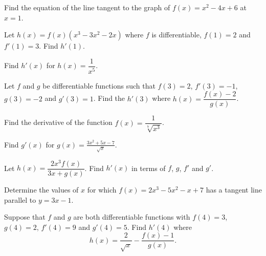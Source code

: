 \begin{exercise}
Find the equation of the line tangent to the graph of \(f(x)=x^2-4x+6\)
at \(x=1\).
\end{exercise}
\vspace*{6\baselineskip}

\begin{exercise}
Let \(h(x)=f(x)(x^3-3x^2-2x)\) where \(f\) is differentiable, \(f(1)=2\)
and \(f'(1)=3\). Find \(h'(1)\).
\end{exercise}
\vspace*{6\baselineskip}

\begin{exercise}
Find \(h'(x)\) for \(h(x)=\dfrac{1}{x^5}\).
\end{exercise}
\vspace*{6\baselineskip}

\begin{exercise}
Let \(f\) and \(g\) be differentiable functions such that \(f(3)=2\),
\(f'(3)=-1\), \(g(3)=-2\) and \(g'(3)=1\). Find the \(h'(3)\) where
\(h(x)=\dfrac{f(x)-2}{g(x)}\).
\end{exercise}
\vspace*{6\baselineskip}

\begin{exercise}
Find the derivative of the function \(f(x)=\dfrac{1}{\sqrt[7]{x^3}}\).
\end{exercise}
\vspace*{6\baselineskip}

\begin{exercise}
  Find \(g'(x)\) for
  \(g(x)=\frac{3x^2+5x-7}{\sqrt{x}}\).
\end{exercise}
\vspace*{6\baselineskip}

\begin{exercise}
Let \(h(x)=\dfrac{2x^3f(x)}{3x+g(x)}\). Find \(h'(x)\) in terms of
\(f\), \(g\), \(f'\) and \(g'\).
\end{exercise}
\vspace*{6\baselineskip}

\begin{exercise}
Determine the values of \(x\) for which \(f(x)=2x^3-5x^2-x+7\) has a
tangent line parallel to \(y=3x-1\).
\end{exercise}
\vspace*{6\baselineskip}

\begin{exercise}
Suppose that \(f\) and \(g\) are both differentiable functions with
\(f(4)=3\), \(g(4)=2\), \(f'(4)=9\) and \(g'(4)=5\). Find \(h'(4)\)
where \[
h(x)=\frac{2}{\sqrt{x}}-\frac{f(x)-1}{g(x)}.
\]
\end{exercise}

